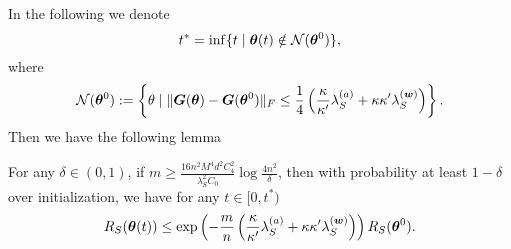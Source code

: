\documentclass{article}
\begin{document}
\noindent In the following we denote
\begin{equation}
    t^* = \inf\{t \mid \bm{\theta}(t)\notin \mathcal{N}(\bm{\theta}^0)\},
\end{equation}
where
\begin{equation}
    \mathcal{N}(\bm{\theta}^0) := \left\{\theta \mid \lVert\bm{G}(\bm{\theta}) - \bm{G}(\bm{\theta}^0)\rVert_F\leq \frac{1}{4}\left(\frac{\kappa}{\kappa'}\lambda_S^{(a)}+\kappa\kappa'\lambda_S^{(\bm{w})}\right)\right\}.
\end{equation}
Then we have the following lemma
\begin{lem}\label{lem:exp_RS}
    For any $\delta\in(0,1)$, if $m\geq\frac{16n^2M^4d^2C_4^2}{\lambda_S^2C_0}\log\frac{4n^2}{\delta}$, then with probability at least $1-\delta$ over initialization, we have for any $t\in[0, t^*)$
    \begin{equation}
        R_S(\bm{\theta}(t)) \leq \exp\left(-\frac{m}{n}\left(\frac{\kappa}{\kappa'}\lambda_S^{(a)}+\kappa\kappa'\lambda_S^{(\bm{w})}\right)\right)R_S(\bm{\theta}^0).
    \end{equation}
\end{lem}
\end{document}
